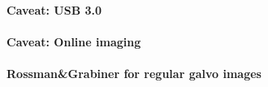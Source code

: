 \documentclass[ArticleMain.tex]{subfiles}
\begin{document}
\paragraph{Caveat: USB 3.0}

\paragraph{Caveat: Online imaging}

\paragraph{Rossman&Grabiner for regular galvo images}
\end{document}
